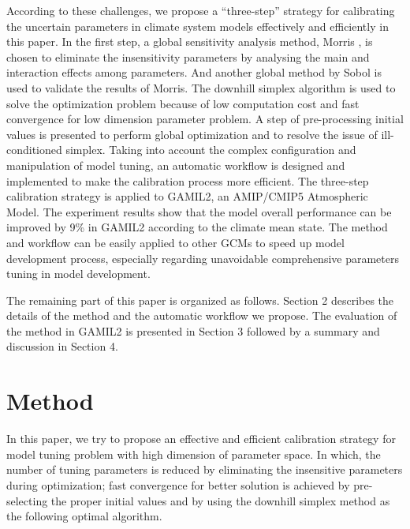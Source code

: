 \documentclass[gmd, manuscript]{copernicus}
\begin{document}
According to these challenges, we propose a ``three-step'' strategy for calibrating the uncertain parameters in climate system models effectively and efficiently in this paper. In the first step, a global sensitivity analysis method, Morris \citep{morris1991factorial, campolongo2007effective}, is chosen to eliminate the insensitivity parameters by analysing the main and interaction effects among parameters. And another global method by Sobol \citep{sobol2001global} is used to validate the results of Morris. The downhill simplex algorithm is used to solve the optimization problem because of low computation cost and fast convergence for low dimension parameter problem. A step of pre-processing initial values is presented to perform global optimization and to resolve the issue of ill-conditioned simplex. Taking into account the complex configuration and manipulation of model tuning, an automatic workflow is designed and implemented to make the calibration process more efficient. The three-step calibration strategy is applied to GAMIL2, an AMIP/CMIP5 Atmospheric Model. The experiment results show that the model overall performance can be improved by 9\% in GAMIL2 according to the climate mean state. The method and workflow can be easily applied to other GCMs to speed up model development process, especially regarding unavoidable comprehensive parameters tuning in model development.


The remaining part of this paper is organized as follows. Section 2 describes the details of the method and the automatic workflow we propose. The evaluation of the method in GAMIL2 is presented in Section 3 followed by a summary and discussion in Section 4.


\section{Method}
In this paper, we try to propose an effective and efficient calibration strategy for model tuning problem with high dimension of parameter space. In which, the number of tuning parameters is reduced by eliminating the insensitive parameters during optimization; fast convergence for better solution is achieved by pre-selecting the proper initial values and by using the downhill simplex method as the following optimal algorithm.
\end{document}
